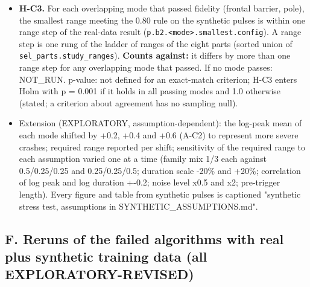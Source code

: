 \begin{itemize}
\item \textbf{H-C3.} For each overlapping mode that passed fidelity (frontal barrier, pole), the smallest range meeting the 0.80 rule on the synthetic pulses is within one range step of the real-data result (\texttt{p.b2.<mode>.smallest.config}). A range step is one rung of the ladder of ranges of the eight parts (sorted union of \texttt{sel\_parts.study\_ranges}). \textbf{Counts against:} it differs by more than one range step for any overlapping mode that passed. If no mode passes: NOT\_RUN. p-value: not defined for an exact-match criterion; H-C3 enters Holm with p = 0.001 if it holds in all passing modes and 1.0 otherwise (stated; a criterion about agreement has no sampling null).
\item Extension (EXPLORATORY, assumption-dependent): the log-peak mean of each mode shifted by +0.2, +0.4 and +0.6 (A-C2) to represent more severe crashes; required range reported per shift; sensitivity of the required range to each assumption varied one at a time (family mix 1/3 each against 0.5/0.25/0.25 and 0.25/0.25/0.5; duration scale -20\% and +20\%; correlation of log peak and log duration +-0.2; noise level x0.5 and x2; pre-trigger length). Every figure and table from synthetic pulses is captioned "synthetic stress test, assumptions in SYNTHETIC\_ASSUMPTIONS.md".
\end{itemize}

\subsection*{F. Reruns of the failed algorithms with real plus synthetic training data (all EXPLORATORY-REVISED)}

